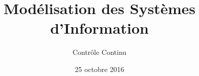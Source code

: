\title{
   Modélisation des Systèmes d'Information
}
\author{
	Contrôle Continu
}
\date{25 octobre 2016}
